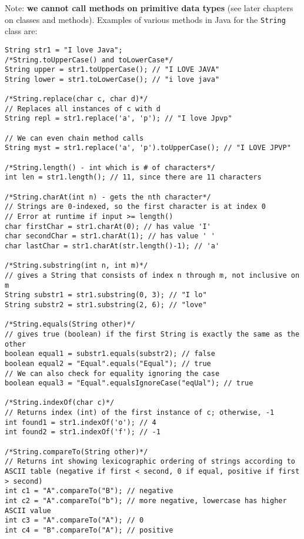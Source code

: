 \noindent Note: \textbf{we cannot call methods on primitive data types} (see later chapters on classes and methods). Examples of various methods in Java for the \verb|String| class are:
\begin{lstlisting}
String str1 = "I love Java";
/*String.toUpperCase() and toLowerCase*/
String upper = str1.toUpperCase(); // "I LOVE JAVA"
String lower = str1.toLowerCase(); // "i love java"

/*String.replace(char c, char d)*/
// Replaces all instances of c with d
String repl = str1.replace('a', 'p'); // "I love Jpvp"

// We can even chain method calls
String myst = str1.replace('a', 'p').toUpperCase(); // "I LOVE JPVP"

/*String.length() - int which is # of characters*/
int len = str1.length(); // 11, since there are 11 characters

/*String.charAt(int n) - gets the nth character*/
// Strings are 0-indexed, so the first character is at index 0
// Error at runtime if input >= length()
char firstChar = str1.charAt(0); // has value 'I'
char secondChar = str1.charAt(1); // has value ' '
char lastChar = str1.charAt(str.length()-1); // 'a'

/*String.substring(int n, int m)*/
// gives a String that consists of index n through m, not inclusive on m
String substr1 = str1.substring(0, 3); // "I lo"
String substr2 = str1.substring(2, 6); // "love"

/*String.equals(String other)*/
// gives true (boolean) if the first String is exactly the same as the other
boolean equal1 = substr1.equals(substr2); // false
boolean equal2 = "Equal".equals("Equal"); // true
// We can also check for equality ignoring the case
boolean equal3 = "Equal".equalsIgnoreCase("eqUal"); // true

/*String.indexOf(char c)*/
// Returns index (int) of the first instance of c; otherwise, -1
int found1 = str1.indexOf('o'); // 4
int found2 = str1.indexOf('f'); // -1

/*String.compareTo(String other)*/
// Returns int showing lexicographic ordering of strings according to ASCII table (negative if first < second, 0 if equal, positive if first > second)
int c1 = "A".compareTo("B"); // negative
int c2 = "A".compareTo("b"); // more negative, lowercase has higher ASCII value
int c3 = "A".compareTo("A"); // 0
int c4 = "B".compareTo("A"); // positive
\end{lstlisting}

